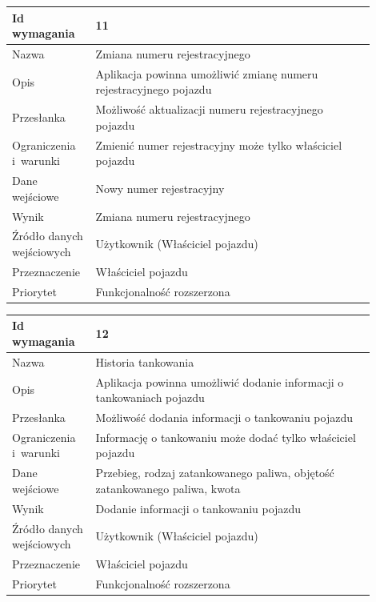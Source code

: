 \documentclass[12pt]{article}
\begin{document}
\begin{table}[H]
\begin{center}
	\begin{tabular}{|p{0.18\linewidth}|p{0.72\linewidth}|}%
	\hline
	Id wymagania 	& 11 				\\ \hline
	Nazwa			& Zmiana numeru rejestracyjnego \\ \hline
	Opis &Aplikacja powinna umożliwić zmianę numeru rejestracyjnego pojazdu
\\ \hline
	Przesłanka & Możliwość aktualizacji numeru rejestracyjnego pojazdu  \\ \hline
	Ograniczenia i~warunki & Zmienić numer rejestracyjny może tylko właściciel pojazdu \\ \hline
	Dane wejściowe & Nowy numer rejestracyjny \\ \hline
	Wynik & Zmiana numeru rejestracyjnego\\ \hline
	Źródło danych wejściowych &Użytkownik (Właściciel pojazdu)\\ \hline
	Przeznaczenie & Właściciel pojazdu\\ \hline
	Priorytet & Funkcjonalność rozszerzona \\ \hline
	\end{tabular}
\end{center}
\end{table}
\begin{table}[H]
\begin{center}
	\begin{tabular}{|p{0.18\linewidth}|p{0.72\linewidth}|}%
	\hline
	Id wymagania 	& 12 				\\ \hline
	Nazwa			& Historia tankowania \\ \hline
	Opis &Aplikacja powinna umożliwić dodanie informacji o tankowaniach pojazdu
\\ \hline
	Przesłanka & Możliwość dodania informacji o tankowaniu pojazdu  \\ \hline
	Ograniczenia i~warunki & Informację o tankowaniu może dodać tylko właściciel pojazdu \\ \hline
	Dane wejściowe & Przebieg, rodzaj zatankowanego paliwa, objętość zatankowanego paliwa, kwota \\ \hline
	Wynik &Dodanie informacji o tankowaniu pojazdu\\ \hline
	Źródło danych wejściowych &Użytkownik (Właściciel pojazdu)\\ \hline
	Przeznaczenie & Właściciel pojazdu\\ \hline
	Priorytet & Funkcjonalność rozszerzona \\ \hline
	\end{tabular}
\end{center}
\end{table}
\end{document}
